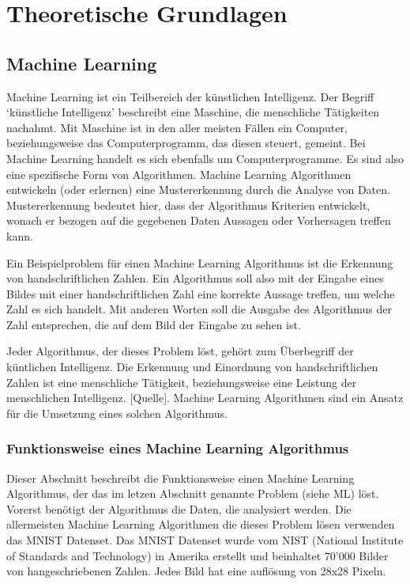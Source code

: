\chapter{Theoretische Grundlagen}

\section{Machine Learning}
\label{chap:t_ml}
Machine Learning ist ein Teilbereich der künstlichen Intelligenz. Der Begriff
`künstliche Intelligenz' beschreibt eine Maschine, die menschliche Tätigkeiten
nachahmt. Mit Maschine ist in den aller meisten Fällen ein Computer,
beziehungsweise das Computerprogramm, das diesen steuert, gemeint. Bei Machine
Learning handelt es sich ebenfalls um Computerprogramme. Es sind also eine
spezifische Form von Algorithmen. Machine Learning Algorithmen entwickeln (oder
erlernen) eine Mustererkennung durch die Analyse von Daten. Mustererkennung
bedeutet hier, dass der Algorithmus Kriterien entwickelt, wonach er bezogen auf
die gegebenen Daten Aussagen oder Vorhersagen treffen kann.

Ein Beispielproblem für einen Machine Learning Algorithmus ist die Erkennung von
handschriftlichen Zahlen. Ein Algorithmus soll also mit der Eingabe eines Bildes
mit einer handschriftlichen Zahl eine korrekte Aussage treffen, um welche Zahl
es sich handelt. Mit anderen Worten soll die Ausgabe des Algorithmus der Zahl
entsprechen, die auf dem Bild der Eingabe zu sehen ist.

Jeder Algorithmus, der dieses Problem löst, gehört zum Überbegriff der
küntlichen Intelligenz. Die Erkennung und Einordnung von handschriftlichen
Zahlen ist eine menschliche Tätigkeit, beziehungsweise eine Leistung der
menschlichen Intelligenz. [Quelle]. Machine Learning Algorithmen sind ein Ansatz
für die Umsetzung eines solchen Algorithmus.

\subsection*{Funktionsweise eines Machine Learning Algorithmus}
Dieser Abschnitt beschreibt die Funktionsweise einen Machine Learning
Algorithmus, der das im letzen Abschnitt genannte Problem (siehe ML) löst.
Vorerst benötigt der Algorithmus die Daten, die analysiert werden. Die
allermeisten Machine Learning Algorithmen die dieses Problem lösen verwenden das
MNIST Datenset. Das MNIST Datenset wurde vom NIST (National Institute of
Standards and Technology) in Amerika erstellt und beinhaltet 70'000 Bilder von
hangeschriebenen Zahlen. Jedes Bild hat eine auflösung von 28x28 Pixeln.

